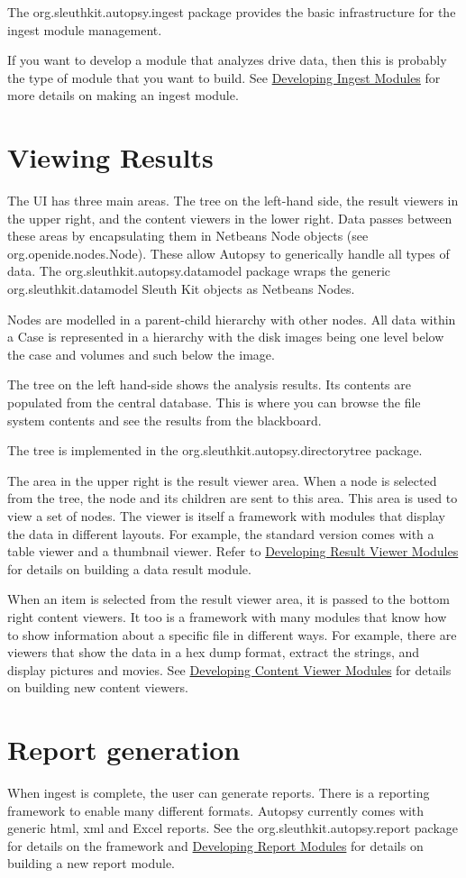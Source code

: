The org.\+sleuthkit.\+autopsy.\+ingest package provides the basic infrastructure for the ingest module management.

If you want to develop a module that analyzes drive data, then this is probably the type of module that you want to build. See \hyperlink{mod_ingest_page}{Developing Ingest Modules} for more details on making an ingest module.\hypertarget{workflow_page_design_view}{}\section{Viewing Results}\label{workflow_page_design_view}
The UI has three main areas. The tree on the left-\/hand side, the result viewers in the upper right, and the content viewers in the lower right. Data passes between these areas by encapsulating them in Netbeans Node objects (see org.\+openide.\+nodes.\+Node). These allow Autopsy to generically handle all types of data. The org.\+sleuthkit.\+autopsy.\+datamodel package wraps the generic org.\+sleuthkit.\+datamodel Sleuth Kit objects as Netbeans Nodes.

Nodes are modelled in a parent-\/child hierarchy with other nodes. All data within a Case is represented in a hierarchy with the disk images being one level below the case and volumes and such below the image.

The tree on the left hand-\/side shows the analysis results. Its contents are populated from the central database. This is where you can browse the file system contents and see the results from the blackboard.

The tree is implemented in the org.\+sleuthkit.\+autopsy.\+directorytree package.

The area in the upper right is the result viewer area. When a node is selected from the tree, the node and its children are sent to this area. This area is used to view a set of nodes. The viewer is itself a framework with modules that display the data in different layouts. For example, the standard version comes with a table viewer and a thumbnail viewer. Refer to \hyperlink{mod_result_page}{Developing Result Viewer Modules} for details on building a data result module.

When an item is selected from the result viewer area, it is passed to the bottom right content viewers. It too is a framework with many modules that know how to show information about a specific file in different ways. For example, there are viewers that show the data in a hex dump format, extract the strings, and display pictures and movies. See \hyperlink{mod_content_page}{Developing Content Viewer Modules} for details on building new content viewers.\hypertarget{workflow_page_design_report}{}\section{Report generation}\label{workflow_page_design_report}
When ingest is complete, the user can generate reports. There is a reporting framework to enable many different formats. Autopsy currently comes with generic html, xml and Excel reports. See the org.\+sleuthkit.\+autopsy.\+report package for details on the framework and \hyperlink{mod_report_page}{Developing Report Modules} for details on building a new report module. 